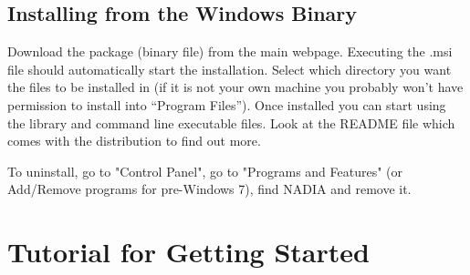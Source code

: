 \documentclass[]{nadia}
\begin{document}
\begin{comment}
--------------------------------------
Change into the example directory:
\begin{myverbatim}
$ cd examples 
\end{myverbatim}
and run one of the examples. e.g.: 
\begin{myverbatim}
$ ./PlanarCDI_example.exe
\end{myverbatim}

If everything is working correcting, you should see some text output
(counting the iterations). If you look at this directory in the
Windows browser you should see that some .ppm image files are created
which give you the reconstruction image for various number of iterations.

Have a look at the code in more detail to see what's going on: 
\begin{myverbatim}
$ xemacs PlanarCDI_example.c 
\end{myverbatim}
and edit some variables to see what happens (eg. change the reconstruction algorithm). 
Then recompile and rerun the example: 
\begin{myverbatim}
$ make 
$ ./PlanarCDI_example.exe
\end{myverbatim}
-------------------------
\end{comment}

\subsection{Installing from the Windows Binary}

Download the package (binary file) from the main webpage. Executing
the .msi file should automatically start the installation. Select
which directory you want the files to be installed in (if it is not
your own machine you probably won't have permission to install into
``Program Files''). Once installed you can start using the library and
command line executable files. Look at the README file which comes
with the distribution to find out more. 

To uninstall, go to "Control Panel", go to "Programs and Features" (or Add/Remove programs for pre-Windows 7), find
NADIA and remove it.


\newpage

\section{Tutorial for Getting Started}
\label{getting started}
\end{document}
